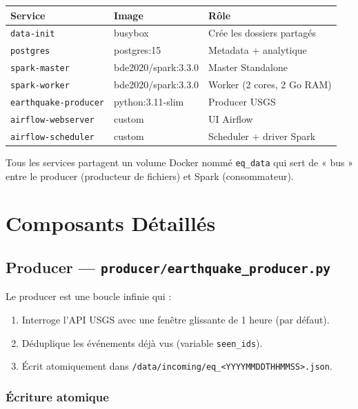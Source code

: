 \documentclass[12pt, a4paper]{article}
\begin{document}
\begin{table}[h]
\centering
\small
\begin{tabular}{|l|l|l|}
\toprule
\textbf{Service} & \textbf{Image} & \textbf{Rôle} \\
\midrule
\texttt{data-init} & busybox & Crée les dossiers partagés \\
\texttt{postgres} & postgres:15 & Metadata + analytique \\
\texttt{spark-master} & bde2020/spark:3.3.0 & Master Standalone \\
\texttt{spark-worker} & bde2020/spark:3.3.0 & Worker (2 cores, 2 Go RAM) \\
\texttt{earthquake-producer} & python:3.11-slim & Producer USGS \\
\texttt{airflow-webserver} & custom & UI Airflow \\
\texttt{airflow-scheduler} & custom & Scheduler + driver Spark \\
\bottomrule
\end{tabular}
\end{table}

Tous les services partagent un volume Docker nommé \texttt{eq\_data} qui sert de « bus » entre le producer (producteur de fichiers) et Spark (consommateur).

\section{Composants Détaillés}

\subsection{Producer — \texttt{producer/earthquake\_producer.py}}

Le producer est une boucle infinie qui :

\begin{enumerate}
  \item Interroge l'API USGS avec une fenêtre glissante de 1 heure (par défaut).
  \item Déduplique les événements déjà vus (variable \texttt{seen\_ids}).
  \item Écrit atomiquement dans \texttt{/data/incoming/eq\_<YYYYMMDDTHHMMSS>.json}.
\end{enumerate}

\subsubsection{Écriture atomique}
\end{document}
